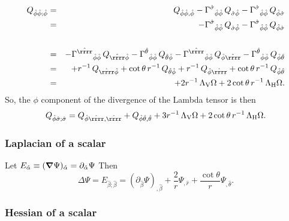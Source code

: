 \documentclass[\mydriver,12pt,twoside,notitlepage,a4paper]{article}
\newcommand{\nab}{\mbox{\boldmath $\nabla$} {}}
\begin{document}
\begin{eqnarray}
Q_{\hat\phi\hat\phi;\hat\phi}
&=&Q_{\hat\phi\hat\phi,\hat\phi}
-{\Gamma^{\hat\sigma}}_{\hat\phi\hat\phi}\,Q_{\hat\sigma\hat\phi}
-{\Gamma^{\hat\sigma}}_{\hat\phi\hat\phi}\,Q_{\hat\phi\hat\sigma}
\cr
&=&
-{\Gamma^{\hat\sigma}}_{\hat\phi\hat\phi}\,Q_{\hat\sigma\hat\phi}
-{\Gamma^{\hat\sigma}}_{\hat\phi\hat\phi}\,Q_{\hat\phi\hat\sigma}
\cr
\cr
&=&
-{\Gamma^{\hat\rrrr}}_{\hat\phi\hat\phi}\,Q_{\hat\rrrr\hat\phi}
-{\Gamma^{\hat\theta}}_{\hat\phi\hat\phi}\,Q_{\hat\theta\hat\phi}
-{\Gamma^{\hat\rrrr}}_{\hat\phi\hat\phi}\,Q_{\hat\phi\hat\rrrr}
-{\Gamma^{\hat\theta}}_{\hat\phi\hat\phi}\,Q_{\hat\phi\hat\theta}
\cr
&=&
+r^{-1}\,Q_{\hat\rrrr\hat\phi}
+\cot\theta\,r^{-1}\,Q_{\hat\theta\hat\phi}
+r^{-1}\,Q_{\hat\phi\hat\rrrr}
+\cot\theta\,r^{-1}\,Q_{\hat\phi\hat\theta}
\cr
&=&
+2r^{-1}\,\Lambda_{\rm V}\Omega
+2\cot\theta\,r^{-1}\,\Lambda_{\rm H}\Omega.
\end{eqnarray}
So, the $\phi$ component of the divergence of the Lambda tensor is then
\begin{equation}
Q_{\hat\phi\hat\sigma;\hat\sigma}=
Q_{\hat\phi\hat\rrrr,\hat\rrrr}
+Q_{\hat\phi\hat\theta,\hat\theta}
+3r^{-1}\,\Lambda_{\rm V}\Omega
+2\cot\theta\,r^{-1}\,\Lambda_{\rm H}\Omega.
\end{equation}

\subsubsection{Laplacian of a scalar}
Let
$E_{\hat \alpha}\equiv (\nab\Psi)_{\hat\alpha} = \partial_{\hat\alpha}\Psi$
Then
\begin{equation}
\Delta\Psi = E_{\hat\beta;\hat\beta}
= (\partial_{\hat\beta}\Psi)_{,\hat\beta} +
  \frac{2}{r}\Psi_{,\hat r} + \frac{\cot\!\theta}{r}\Psi_{,\hat\theta}.
\end{equation}

\subsubsection{Hessian of a scalar}
\end{document}
